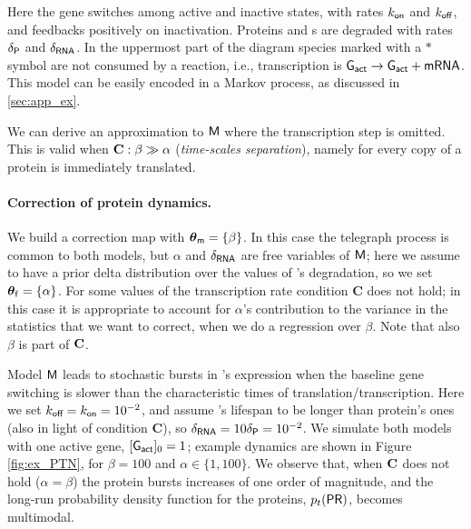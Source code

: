 \documentclass[runningheads,a4paper]{llncs}
\newcommand{\bM}{{\sf{M}}}
\newcommand{\pfpar}{\bth_{\sf{f}}}
\newcommand{\pmpar}{\bth_{\sf{m}}}
\newcommand{\bth}{\boldsymbol{\theta}}
\newcommand{\PR}{{{\sf{PR}}}}
\newcommand{\COND}{{{\bf  C}}}
\newcommand{\GEA}{{\sf{G}_{\text{\sf act}}}}
\newcommand{\RNA}{{\sf{mRNA}}}
\begin{document}
Here the gene switches among {\sf active} and {\sf inactive} states, with rates $k_{\text{\sf on}}$ and $k_{\text{\sf off}}$, and \PR{} feedbacks positively on inactivation. Proteins and \RNA{}s are degraded with rates ${\delta_{\text{\sf P}}}$ and ${\delta_{\text{\sf RNA}}}$.
 In the uppermost part of the diagram species marked with a $\ast$ symbol are not consumed by a reaction, i.e., \RNA{} transcription is $\GEA \to \GEA +\RNA{}$. This model can be easily encoded in a Markov process, as discussed in \ref{sec:app_ex}.

We can derive an approximation to $\bM$  where the transcription step is omitted. This is valid  when $\COND:\beta \gg \alpha$ ({\em time-scales separation}), namely for every copy of \RNA{} a protein is immediately translated.

\paragraph{Correction of protein dynamics.} We build a correction map  with $\pmpar=\{\beta\}$. In this case the telegraph process is common to both models, but $\alpha$  and $\delta_{\text{\sf RNA}}$ are free variables of $\bM$; here we assume to have a prior delta distribution over the values of \RNA{}'s degradation,  so we set $\pfpar = \{\alpha\}$. For some  values of the transcription rate condition \COND{}  does not hold; in this case it is appropriate to account for $\alpha$'s contribution to the variance in the statistics that we want to correct, when we do a regression over $\beta$. Note that also  $\beta$ is part  of $\COND{}$.

Model  $\bM$ leads to stochastic bursts in \PR{}'s expression  when the baseline gene switching is slower than the characteristic times of translation/transcription. Here we set $k_{\text{\sf off}} = k_{\text{\sf on}} = 10^{-2}$, and assume \RNA{}'s lifespan  to be longer than protein's ones (also in light of condition \COND{}), so  $\delta_{\text{\sf RNA}} =10 \delta_{\text{\sf P}} = 10^{-2}$. We simulate both models with one active gene, $[\GEA]_0=1$; example dynamics are shown in  Figure \ref{fig:ex_PTN}, for $\beta=100$ and $\alpha\in\{1,100\}$. We observe that, when $\COND{}$ does not hold ($\alpha=\beta$) the protein bursts increases of one order of magnitude, and  the long-run  probability density function for the proteins, $p_{t}(\PR)$, becomes multimodal.


\newcommand{\eventually}[2]{\mathbf{F}_{[#1,#2]}}
\end{document}
